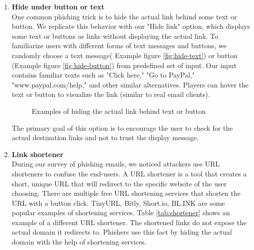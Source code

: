\begin{enumerate}
    \item \textbf{Hide under button or text}\\
          One common phishing trick is to hide the actual link behind some text or button. We replicate this behavior with our "Hide link" option, which displays some text or buttons as links without displaying the actual link. To familiarize users with different forms of text messages and buttons, we randomly choose a text message( Example figure \ref{fig:hide-text}) or button (Example figure \ref{fig:hide-button}) from predefined set of input. Our input contains familiar texts such as "Click here," "Go to PayPal," "www.paypal.com/help," and other similar alternatives. Players can hover the text or button to visualize the link (similar to real email clients).

          \begin{figure}[ht]
              \hfill
              \caption{Examples of hiding the actual link behind text or button}
          \end{figure}

          The primary goal of this option is to encourage the user to check for the actual destination links and not to trust the display message.

    \item \textbf{Link shortener}\\
          During our survey of phishing emails, we noticed attackers use URL shorteners to confuse the end-users. A URL shortener is a tool that creates a short, unique URL that will redirect to the specific website of the user choosing. There are multiple free URL shortening services that shorten the URL with a button click. TinyURL, Bitly, Short.io, BL.INK are some popular examples of shortening services. Table \ref{tab:shortener} shows an example of a different URL shortener. The shortened links do not expose the actual domain it redirects to. Phishers use this fact by hiding the actual domain with the help of shortening services.


\end{enumerate}
